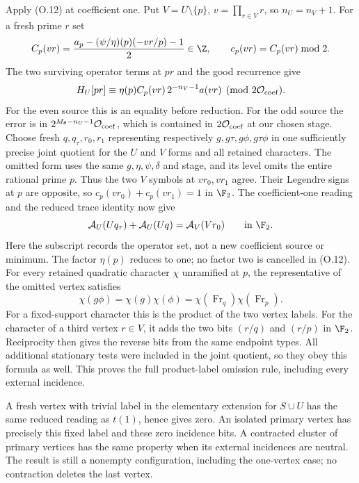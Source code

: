 Apply (O.12) at coefficient one.  Put $V=U\setminus\{p\}$,
$v=\prod_{r\in V}r$, so $n_U=n_V+1$.  For a fresh prime $r$ set
\[
 C_p(vr)=\frac{a_p-(\psi/\eta)(p)(-vr/p)-1}{2}\in\Z,
 \qquad c_p(vr)=C_p(vr)\bmod2.
\]
The two surviving operator terms at $pr$ and the good recurrence give
\[
 H_U[pr]\equiv
   \eta(p)C_p(vr)\,2^{-n_V-1}a(vr)\pmod{2\mathcal O_{\rm coef}}.
\]
For the even source this is an equality before reduction.  For the
odd source the error is in $2^{M_\theta-n_U-1}\mathcal O_{\rm coef}$,
which is contained in $2\mathcal O_{\rm coef}$ at our chosen stage.
Choose fresh $q,q_\tau,r_0,r_1$ representing respectively
$g,g\tau,g\phi,g\tau\phi$ in one sufficiently precise joint quotient
for the $U$ and $V$ forms and all retained characters.
The omitted form uses the same $g,\eta,\psi,\delta$ and stage,
and its level omits the entire rational prime $p$.
Thus the two $V$ symbols at $vr_0,vr_1$ agree.  Their Legendre
signs at $p$ are opposite, so $c_p(vr_0)+c_p(vr_1)=1$ in $\F_2$.
The coefficient-one reading and the reduced trace identity now give
\[
             \mathcal A_U(Uq_\tau)+\mathcal A_U(Uq)=\mathcal A_V(Vr_0)\qquad\text{in }\F_2.
\]
Here the subscript records the operator set, not a new coefficient
source or minimum. The factor $\eta(p)$ reduces to one; no factor
two is cancelled in (O.12). For every retained quadratic character
$\chi$ unramified at $p$, the representative of the omitted vertex
satisfies
\[
 \chi(g\phi)=\chi(g)\chi(\phi)
            =\chi(\operatorname{Fr}_q)\chi(\operatorname{Fr}_p).
\]
For a fixed-support character this is the product of the two vertex
labels. For the character of a third vertex $r\in V$, it adds the
two bits $(r/q)$ and $(r/p)$ in $\F_2$. Reciprocity then gives the
reverse bits from the same endpoint types. All additional stationary
tests were included in the joint quotient, so they obey this formula
as well. This proves the full product-label omission rule, including
every external incidence.

A fresh vertex with trivial label in the elementary extension for
$S\cup U$ has the same reduced reading as $t(1)$, hence gives zero.
An isolated primary vertex has precisely this fixed label and these
zero incidence bits. A contracted cluster of primary vertices has
the same property when its external incidences are neutral. The
result is still a nonempty configuration, including the one-vertex
case; no contraction deletes the last vertex.

